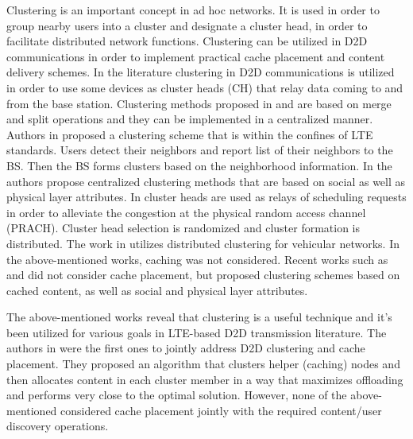 \documentclass[10pt,a4paper,twocolumn]{article}
\begin{document}
Clustering is an important concept in ad hoc networks. It is used in order to group nearby users into a cluster and designate a cluster head, in order to facilitate distributed network functions. Clustering can be utilized in D2D communications in order to implement practical cache placement and content delivery schemes. In the literature clustering in D2D communications is utilized in order to use some devices as cluster heads (CH) that relay data coming to and from the base station. Clustering methods proposed in \cite{yaacoub2013achieving} and \cite{asadi2017network} are based on  merge and split operations and they can be implemented in a centralized manner. Authors in \cite{doumiati2017framework} proposed a clustering scheme that is within the confines of LTE standards.  Users detect their neighbors and report list of their neighbors to the BS. Then the BS forms clusters based on the neighborhood information. In \cite{zhang2017peer, feng2018resource, yang2018social} the authors propose centralized clustering methods that are based on social as well as physical layer attributes. In \cite{gharbieh2018self} cluster heads are used as relays of scheduling requests in order to alleviate the congestion at the physical random access channel (PRACH). Cluster head selection is randomized and cluster formation is distributed. The work in \cite{gupta2018cluster} utilizes distributed clustering for vehicular networks. In the above-mentioned works, caching was not considered. Recent works such as \cite{swain2020novel} and \cite{asheralieva2020combining} did not consider cache placement, but proposed  clustering schemes based on cached content, as well as social and physical layer attributes.

The above-mentioned works reveal that clustering is a useful technique and it's been utilized for various goals in LTE-based D2D transmission literature.  The authors in \cite{Kazez2019Clustering} were the first ones to jointly address D2D clustering and cache placement. They proposed an algorithm that clusters helper (caching) nodes and then allocates content in each cluster member in a way that maximizes offloading and performs very close to the optimal solution.  However, none of the above-mentioned considered cache placement jointly with the required content/user discovery operations.
\end{document}
